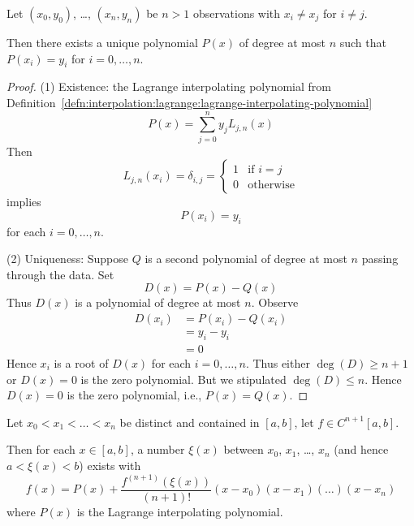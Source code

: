 \begin{thm}
Let $(x_{0},y_{0})$, \dots, $(x_{n}, y_{n})$ be $n>1$ observations with
$x_{i}\neq x_{j}$ for $i\neq j$.

Then there exists a unique polynomial $P(x)$ of degree at most $n$ such
that $P(x_{i})=y_{i}$ for $i=0,\dots,n$.
\end{thm}

\begin{proof}
  (1) Existence: the Lagrange interpolating polynomial from Definition~\ref{defn:interpolation:lagrange:lagrange-interpolating-polynomial}
  \begin{equation}
    P(x) = \sum^{n}_{j=0}y_{j}L_{j,n}(x)
  \end{equation}
  Then
  \begin{equation}
    L_{j,n}(x_{i}) = \delta_{i,j} = \begin{cases}1 &\mbox{if $i=j$}\\
      0 & \mbox{otherwise}
    \end{cases}
  \end{equation}
  implies
  \begin{equation}
    P(x_{i})=y_{i}
  \end{equation}
  for each $i=0,\dots,n$.

  (2) Uniqueness: Suppose $Q$ is a second polynomial of degree at most
  $n$ passing through the data. Set
  \begin{equation}
    D(x) = P(x) - Q(x)
  \end{equation}
  Thus $D(x)$ is a polynomial of degree at most $n$. Observe
  \begin{subequations}
    \begin{align}
      D(x_{i}) &= P(x_{i}) - Q(x_{i})\\
      &= y_{i} - y_{i}\\
      &= 0
    \end{align}
  \end{subequations}
  Hence $x_{i}$ is a root of $D(x)$ for each $i=0,\dots,n$.
  Thus either $\deg(D)\geq n+1$ or $D(x)=0$ is the zero polynomial.
  But we stipulated $\deg(D)\leq n$.
  Hence $D(x)=0$ is the zero polynomial, i.e., $P(x)=Q(x)$.
\end{proof}

\begin{thm}[Error]\label{thm:interpolation:lagrange:error}
Let $x_{0}<x_{1}<\dots<x_{n}$ be distinct and contained in $[a,b]$, let
$f\in C^{n+1}[a,b]$.

Then for each $x\in[a,b]$, a number $\xi(x)$ between $x_{0}$, $x_{1}$,
\dots, $x_{n}$ (and hence $a < \xi(x) < b$) exists with
\begin{equation}
  f(x) = P(x) + \frac{f^{(n+1)}(\xi(x))}{(n+1)!}(x-x_{0})(x-x_{1})(\dots)(x-x_{n})
\end{equation}
where $P(x)$ is the Lagrange interpolating polynomial.
\end{thm}

